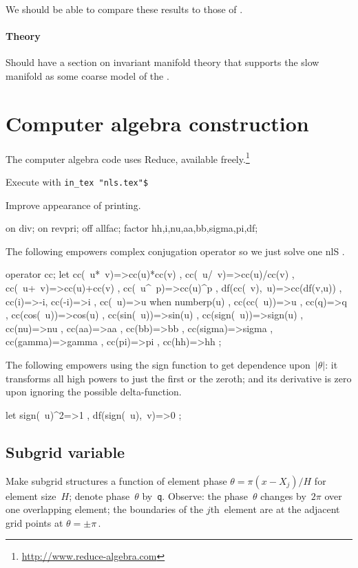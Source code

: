 \documentclass[12pt,a5paper]{article}
\begin{document}
We should be able to compare these results to those of \cite{Alfimov2002}.



\paragraph{Theory}  Should have a section on invariant manifold theory that supports the slow manifold as some coarse model of the \pde.



\section{Computer algebra construction}

The computer algebra code uses Reduce, available freely.\footnote{\url{http://www.reduce-algebra.com}}

Execute with \verb|in_tex "nls.tex"$|

Improve appearance of printing.
\begin{reduce}
on div; on revpri; off allfac;
factor hh,i,nu,aa,bb,sigma,pi,df;
\end{reduce}

The following empowers complex conjugation operator so we just solve one nlS \pde.
\begin{reduce}
operator cc;
let { cc(~u*~v)=>cc(u)*cc(v) 
    , cc(~u/~v)=>cc(u)/cc(v) 
    , cc(~u+~v)=>cc(u)+cc(v) 
    , cc(~u^~p)=>cc(u)^p 
    , df(cc(~v),~u)=>cc(df(v,u))
    , cc(i)=>-i, cc(-i)=>i
    , cc(~u)=>u when numberp(u)
    , cc(cc(~u))=>u
    , cc(q)=>q
    , cc(cos(~u))=>cos(u)
    , cc(sin(~u))=>sin(u)
    , cc(sign(~u))=>sign(u)
    , cc(nu)=>nu
    , cc(aa)=>aa
    , cc(bb)=>bb
    , cc(sigma)=>sigma
    , cc(gamma)=>gamma
    , cc(pi)=>pi
    , cc(hh)=>hh
    };
\end{reduce}

The following empowers using the sign function to get dependence upon~\(|\theta|\): it transforms all high powers to just the first or the zeroth; and its derivative is zero upon ignoring the possible delta-function.
\begin{reduce}
let { sign(~u)^2=>1
    , df(sign(~u),~v)=>0 };
\end{reduce}

\subsection{Subgrid variable}

Make subgrid structures a function of element phase
$\theta=\pi(x-X_j)/H$ for element size~$H$; denote phase~$\theta$
by~\verb|q|.
Observe: the phase~$\theta$ changes by~$2\pi$ over one overlapping element; the boundaries of the $j$th~element are at the
adjacent grid points at $\theta=\pm\pi$\,.
\end{document}
